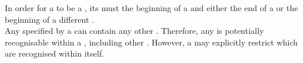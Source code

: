 In order for a  to be a , its  must  the beginning of a  and either the end of a  or the beginning of a different . \\

Any  specified by a  can contain any other . Therefore, any  is potentially recognisable within a , including other . However, a  may explicitly restrict which  are recognised within itself.

